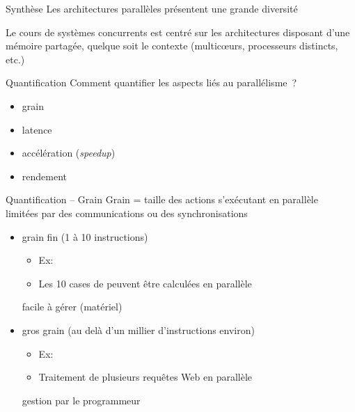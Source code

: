 \begin {frame} {Synthèse}
    Les architectures parallèles présentent une grande diversité

    \vfill

    Le cours de systèmes concurrents est centré sur les architectures
    disposant d'une mémoire partagée, quelque soit le contexte
    (multic{\oe}urs, processeurs distincts, etc.)

\end {frame}




\begin {frame} {Quantification}
    Comment quantifier les aspects liés au parallélisme~?

    \begin {itemize}
	\item grain
	\item latence
	\item accélération (\emph {speedup\/})
	\item rendement
    \end {itemize}
\end {frame}

\begin {frame} {Quantification -- Grain}
    Grain = taille des actions s'exécutant en parallèle \\
    \implique limitées par des communications ou des synchronisations

    \begin {itemize}
	\item grain fin (1 à 10 instructions)

	    \begin {itemize}
		\item Ex: 
		\item Les 10 cases de  peuvent être calculées en
		    parallèle
	    \end {itemize}
	    \implique facile à gérer (matériel)

	\item gros grain (au delà d'un millier d'instructions environ)

	    \begin {itemize}
		\item Ex: 
		\item Traitement de plusieurs requêtes Web en parallèle
	    \end {itemize}
	    \implique gestion par le programmeur


    \end {itemize}

\end {frame}

